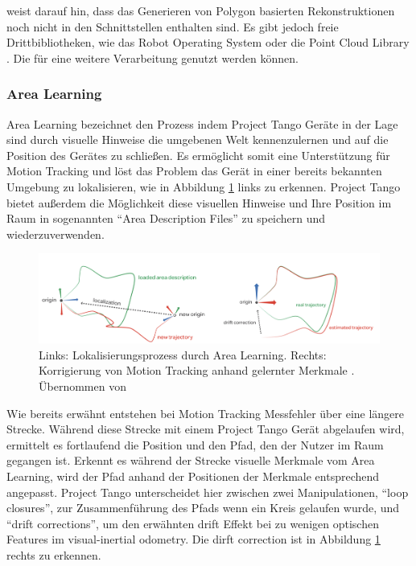 \citet{GoogleDevelopersConcepts:online} weist darauf hin, dass das Generieren von Polygon basierten Rekonstruktionen noch nicht in den Schnittstellen enthalten sind. Es gibt jedoch freie Drittbibliotheken, wie das Robot Operating System \citep{ROS} oder die Point Cloud Library \citep{pcl}. Die für eine weitere Verarbeitung genutzt werden können.

\subsubsection{Area Learning} \label{subsec:area-learning}

Area Learning bezeichnet den Prozess indem Project Tango Geräte in der Lage sind durch visuelle Hinweise die umgebenen Welt kennenzulernen und auf die Position des Gerätes zu schließen. 
Es ermöglicht somit eine Unterstützung für Motion Tracking und löst das Problem das Gerät in einer bereits bekannten Umgebung zu lokalisieren, wie in Abbildung \ref{fig:area-learning} links zu erkennen.
Project Tango bietet außerdem die Möglichkeit diese visuellen Hinweise und Ihre Position im Raum in sogenannten \enquote{Area Description Files} zu speichern und wiederzuverwenden. \citep{GoogleDevelopersConcepts:online}\\

\begin{figure}[h]
  \centering
	\includegraphics[width=1.0\textwidth]{content/images/theory/tango-area-learning.png} 
  \caption{Links: Lokalisierungsprozess durch Area Learning. Rechts: Korrigierung von Motion Tracking anhand gelernter Merkmale . Übernommen von \citet{GoogleDevelopers:online}}
  \label{fig:area-learning}
\end{figure}

Wie bereits erwähnt entstehen bei Motion Tracking Messfehler über eine längere Strecke. 
Während diese Strecke mit einem Project Tango Gerät abgelaufen wird, ermittelt es fortlaufend die Position und den Pfad, den der Nutzer im Raum gegangen ist. 
Erkennt es während der Strecke visuelle Merkmale vom Area Learning, wird der Pfad anhand der Positionen der Merkmale entsprechend angepasst. 
Project Tango unterscheidet hier zwischen zwei Manipulationen, \enquote{loop closures}, zur Zusammenführung des Pfads wenn ein Kreis gelaufen wurde, und \enquote{drift corrections}, um den erwähnten drift Effekt bei zu wenigen optischen Features im visual-inertial odometry. 
Die dirft correction ist in Abbildung \ref{fig:area-learning} rechts zu erkennen. \citep{GoogleDevelopersConcepts:online} \\


